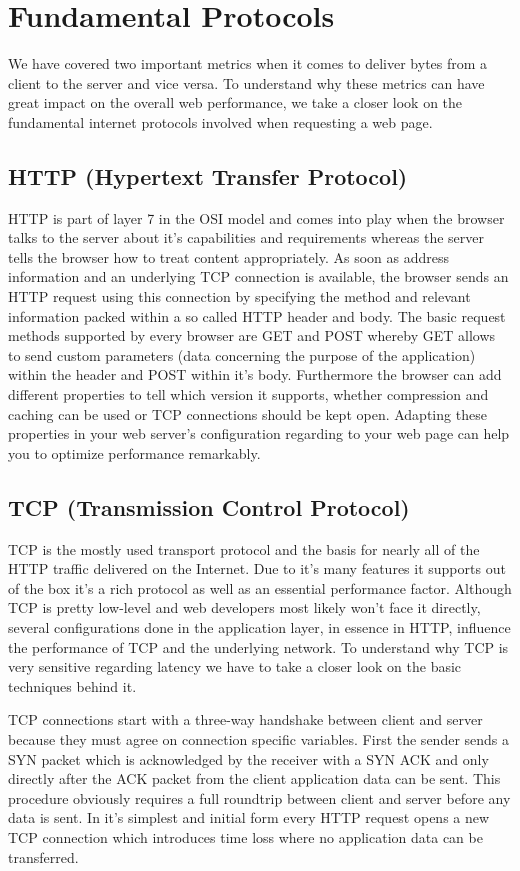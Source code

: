 \section{Fundamental Protocols}
We have covered two important metrics when it comes to deliver bytes from a client to the server and vice versa. To understand why these metrics can have great impact on the overall web performance, we take a closer look on the fundamental internet protocols involved when requesting a web page. 

\subsection{HTTP (Hypertext Transfer Protocol)}
HTTP is part of layer 7 in the OSI model and comes into play when the browser talks to the server about it's capabilities and requirements whereas the server tells the browser how to treat content appropriately. As soon as address information and an underlying TCP connection is available, the browser sends an HTTP request using this connection by specifying the method and relevant information packed within a so called HTTP header and body. The basic request methods supported by every browser are GET and POST whereby GET allows to send custom parameters (data concerning the purpose of the application) within the header and POST within it's body. Furthermore the browser can add different properties to tell which version it supports, whether compression and caching can be used or TCP connections should be kept open. Adapting these properties in your web server's configuration regarding to your web page can help you to optimize performance remarkably. \cite{Chang_2008}

\subsection{TCP (Transmission Control Protocol)}
TCP is the mostly used transport protocol and the basis for nearly all of the HTTP traffic delivered on the Internet. Due to it's many features it supports out of the box it's a rich protocol as well as an essential performance factor. Although TCP is pretty low-level and web developers most likely won't face it directly, several configurations done in the application layer, in essence in HTTP, influence the performance of TCP and the underlying network. To understand why TCP is very sensitive regarding latency we have to take a closer look on the basic techniques behind it. 

TCP connections start with a three-way handshake between client and server because they must agree on connection specific variables. First the sender sends a SYN packet which is acknowledged by the receiver with a SYN ACK and only directly after the ACK packet from the client application data can be sent. This procedure obviously requires a full roundtrip between client and server before any data is sent. In it's simplest and initial form every HTTP request opens a new TCP connection which introduces time loss where no application data can be transferred. 

